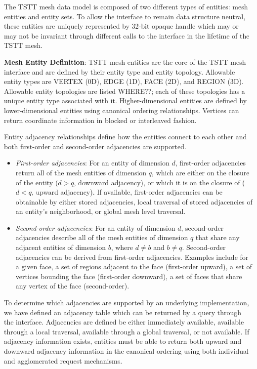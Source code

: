 The TSTT mesh data model is composed of two different types of
entities: mesh entities and entity sets.  To allow the interface to
remain data structure neutral, these entities are uniquely represented
by 32-bit opaque handle which may or may not be invariant through
different calls to the interface in the lifetime of the TSTT mesh.

{\bf Mesh Entity Definition}: TSTT mesh entities are the core of the
TSTT mesh interface and are defined by their entity type and entity
topology.  Allowable entity types are VERTEX (0D), EDGE (1D), FACE
(2D), and REGION (3D).  Allowable entity topologies are listed
WHERE??; each of these topologies has a unique entity type associated
with it.  Higher-dimensional entities are defined by lower-dimensional
entities using canonical ordering relationships.  Vertices can return
coordinate information in blocked or interleaved fashion.

Entity adjacency relationships define how the entities connect to
each other and both first-order and second-order adjacencies are
supported.
\begin{itemize}
\item {\it First-order adjacencies}: For an entity of dimension $d$,
first-order adjacencies return all of the mesh entities of dimension
$q$, which are either on the closure of the entity ($d > q$, downward
adjacency), or which it is on the closure of ($d < q$, upward
adjacency).  If available, first-order adjacencies can be obtainable
by either stored adjacencies, local traversal of stored adjacencies of
an entity's neighborhood, or global mesh level traversal.  

\item {\it Second-order adjacencies}: For an entity of dimension $d$,
second-order adjacencies describe all of the mesh entities of
dimension $q$ that share any adjacent entities of dimension $b$, where
$d \neq b$ and $b \neq q$.  Second-order adjacencies can be derived
from first-order adjacencies.  Examples include for a given face, a
set of regions adjacent to the face (first-order upward), a set of
vertices bounding the face (first-order downward), a set of faces that
share any vertex of the face (second-order).
\end{itemize}

To determine which adjacencies are supported by an underlying
implementation, we have defined an adjacency table which can be
returned by a query through the interface.  Adjacencies are defined be
either immediately available, available through a local traversal,
available through a global traversal, or not available.  If adjacency
information exists, entities must be able to return both upward and
downward adjacency information in the canonical ordering using both
individual and agglomerated request mechanisms.

